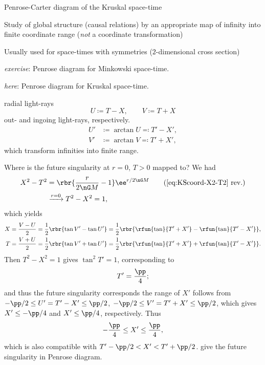 \begin{nameddef}{Penrose-Carter diagram of the Kruskal space-time}

Study of global structure (causal relations) by an appropriate map of infinity
into finite coordinate range (\emph{not} a coordinate transformation)

Usually used for space-times with symmetries ($2$-dimensional cross section)

\emph{exercise}: Penrose diagram for Minkowski space-time.

\emph{here}: Penrose diagram for Kruskal space-time.

radial light-rays
\begin{equation}
U \coloneqq T-X,\qquad V \coloneqq T+X
\end{equation}
out- and ingoing light-rays, respectively.
\begin{equation}
\begin{aligned}
U' &\coloneqq \arctan U \eqqcolon T'-X', \\
V' &\coloneqq \arctan V \eqqcolon T'+X',
\end{aligned}
\end{equation}
which transform infinities into finite range.

Where is the future singularity at $r = 0$, $T > 0$ mapped to? We had
\begin{align}
X^2 - T^2 &= \rbr{\frac{r}{2\nG M} - 1}\ee^{r/2\nG M}
\tag{\ref{eq:KScoord-X2-T2} rev.}\\
&\xrightarrow{r = 0} T^2 - X^2 = 1,
\end{align}
which yields
\begin{equation}
\begin{aligned}
X = \frac{V-U}{2} = \frac{1}{2}\rbr{\tan V' - \tan U'} =
\frac{1}{2}\rbr{\rfun{\tan}{T'+X'}-\rfun{\tan}{T'-X'}}, \\
T = \frac{V+U}{2} = \frac{1}{2}\rbr{\tan V' + \tan U'} =
\frac{1}{2}\rbr{\rfun{\tan}{T'+X'}+\rfun{\tan}{T'-X'}}.
\end{aligned}
\end{equation}
Then $T^2 - X^2 = 1$ gives $\tan^2 T' = 1$, corresponding to
\begin{equation}
T' = \frac{\pp}{4};
\label{eq:penrose-fs-Tp}
\end{equation}and thus the future singularity
corresponds
the range of $X'$ follows from $-\pp/2 \le U' = T'-X' \le \pp/2$,
$-\pp/2 \le V' = T'+X' \le \pp/2$, which gives $X' \le -\pp/4$ and
$X' \le \pp/4$, respectively. Thus
\begin{equation}
-\frac{\pp}{4} \le X' \le \frac{\pp}{4},
\label{eq:penrose-fs-Xp}
\end{equation}
which is also compatible with $T'-\pp/2 < X' < T' + \pp/2$.
 give the future singularity in
Penrose diagram.


\end{nameddef}
